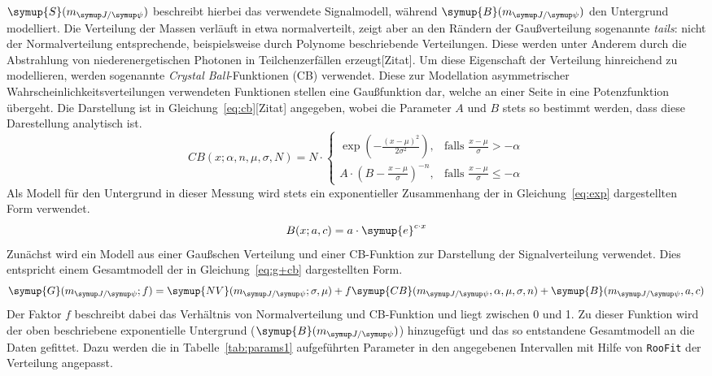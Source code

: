 %
$\symup{S}(m_{\jpsi})$ beschreibt hierbei das verwendete Signalmodell, während $\symup{B}(m_{\jpsi})$ den Untergrund modelliert. Die Verteilung der Massen verläuft in etwa normalverteilt, zeigt aber an den Rändern der Gaußverteilung sogenannte \textit{tails}: nicht der Normalverteilung entsprechende, beispielsweise durch Polynome beschriebende Verteilungen. Diese werden unter Anderem durch die Abstrahlung von niederenergetischen Photonen in Teilchenzerfällen erzeugt[Zitat]. Um diese Eigenschaft der Verteilung hinreichend zu modellieren, werden sogenannte \textit{Crystal Ball}-Funktionen (CB) verwendet. Diese zur Modellation asymmetrischer Wahrscheinlichkeitsverteilungen verwendeten Funktionen stellen eine Gaußfunktion dar, welche an einer Seite in eine Potenzfunktion übergeht. Die Darstellung ist in Gleichung~\ref{eq:cb}[Zitat] angegeben, wobei die Parameter $A$ und $B$ stets so bestimmt werden, dass diese Darestellung analytisch ist.
%
\begin{equation}
  {\displaystyle CB(x;\alpha ,n,{\mu},\sigma,N)=N\cdot {\begin{cases}\exp \left(-{\frac {(x-{\mu})^{2}}{2\sigma ^{2}}}\right),&{\mbox{falls }}{\frac {x-{\mu}}{\sigma }}>-\alpha \\A\cdot \left(B-{\frac {x-{\mu}}{\sigma }}\right)^{-n},&{\mbox{falls }}{\frac {x-{\mu}}{\sigma }}\leqslant -\alpha \end{cases}}}
  \label{eq:cb}
\end{equation}
%
Als Modell für den Untergrund in dieser Messung wird stets ein exponentieller Zusammenhang der in Gleichung~\ref{eq:exp} dargestellten Form verwendet.
%
\begin{equation}
  B(x;a,c)=a\cdot \symup{e}^{c\cdot x}
  \label{eq:exp}
\end{equation}
%
Zunächst wird ein Modell aus einer Gaußschen Verteilung und einer CB-Funktion zur Darstellung der Signalverteilung verwendet. Dies entspricht einem Gesamtmodell der in Gleichung~\ref{eq:g+cb} dargestellten Form.
%
\begin{equation}
  \symup{G}(m_{\jpsi}; f)= \symup{NV}(m_{\jpsi};\sigma,\mu) + f\symup{CB}(m_{\jpsi},\alpha,\mu,\sigma,n) + \symup{B}(m_{\jpsi},a,c)
  \label{eq:g+cb}
\end{equation}
%
Der Faktor $f$ beschreibt dabei das Verhältnis von Normalverteilung und CB-Funktion und liegt zwischen 0 und 1. Zu dieser Funktion wird der oben beschriebene exponentielle Untergrund ($\symup{B}(m_{\jpsi})$) hinzugefügt und das so entstandene Gesamtmodell an die Daten gefittet. Dazu werden die in Tabelle~\ref{tab:params1} aufgeführten Parameter in den angegebenen Intervallen mit Hilfe von \texttt{RooFit} der Verteilung angepasst.
